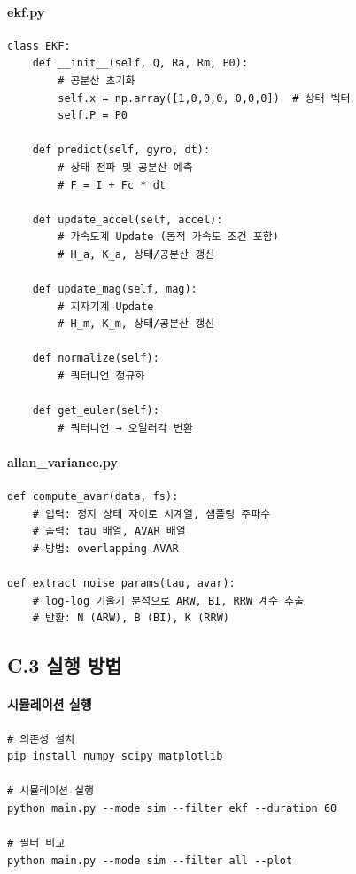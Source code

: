 \paragraph{ekf.py}
 
\begin{verbatim}
class EKF:
    def __init__(self, Q, Ra, Rm, P0):
        # 공분산 초기화
        self.x = np.array([1,0,0,0, 0,0,0])  # 상태 벡터
        self.P = P0
    
    def predict(self, gyro, dt):
        # 상태 전파 및 공분산 예측
        # F = I + Fc * dt
    
    def update_accel(self, accel):
        # 가속도계 Update (동적 가속도 조건 포함)
        # H_a, K_a, 상태/공분산 갱신
    
    def update_mag(self, mag):
        # 지자기계 Update
        # H_m, K_m, 상태/공분산 갱신
    
    def normalize(self):
        # 쿼터니언 정규화
    
    def get_euler(self):
        # 쿼터니언 → 오일러각 변환
\end{verbatim}
 
\paragraph{allan\_variance.py}
 
\begin{verbatim}
def compute_avar(data, fs):
    # 입력: 정지 상태 자이로 시계열, 샘플링 주파수
    # 출력: tau 배열, AVAR 배열
    # 방법: overlapping AVAR
 
def extract_noise_params(tau, avar):
    # log-log 기울기 분석으로 ARW, BI, RRW 계수 추출
    # 반환: N (ARW), B (BI), K (RRW)
\end{verbatim}
 
\subsection*{C.3 실행 방법}
 
\paragraph{시뮬레이션 실행}
 
\begin{verbatim}
# 의존성 설치
pip install numpy scipy matplotlib
 
# 시뮬레이션 실행
python main.py --mode sim --filter ekf --duration 60
 
# 필터 비교
python main.py --mode sim --filter all --plot
\end{verbatim}
 
